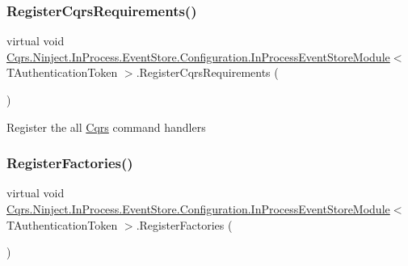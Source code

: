 \subsubsection{\texorpdfstring{Register\+Cqrs\+Requirements()}{RegisterCqrsRequirements()}}
{\footnotesize\ttfamily virtual void \hyperlink{classCqrs_1_1Ninject_1_1InProcess_1_1EventStore_1_1Configuration_1_1InProcessEventStoreModule}{Cqrs.\+Ninject.\+In\+Process.\+Event\+Store.\+Configuration.\+In\+Process\+Event\+Store\+Module}$<$ T\+Authentication\+Token $>$.Register\+Cqrs\+Requirements (\begin{DoxyParamCaption}{ }\end{DoxyParamCaption})\hspace{0.3cm}{\ttfamily [virtual]}}



Register the all \hyperlink{namespaceCqrs}{Cqrs} command handlers 

\mbox{\label{classCqrs_1_1Ninject_1_1InProcess_1_1EventStore_1_1Configuration_1_1InProcessEventStoreModule_a4236d1ad83f4412e54491da63ca122d6_a4236d1ad83f4412e54491da63ca122d6}} 
\subsubsection{\texorpdfstring{Register\+Factories()}{RegisterFactories()}}
{\footnotesize\ttfamily virtual void \hyperlink{classCqrs_1_1Ninject_1_1InProcess_1_1EventStore_1_1Configuration_1_1InProcessEventStoreModule}{Cqrs.\+Ninject.\+In\+Process.\+Event\+Store.\+Configuration.\+In\+Process\+Event\+Store\+Module}$<$ T\+Authentication\+Token $>$.Register\+Factories (\begin{DoxyParamCaption}{ }\end{DoxyParamCaption})\hspace{0.3cm}{\ttfamily [virtual]}}



